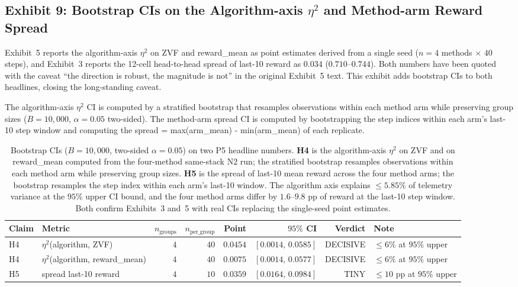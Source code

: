 \subsection{Exhibit 9: Bootstrap CIs on the Algorithm-axis $\eta^{2}$ and Method-arm Reward Spread}
\label{sec:p5-exhibit-headline-cis}

Exhibit~5 reports the algorithm-axis $\eta^{2}$ on ZVF and
reward\_mean as point estimates derived from a single seed
($n{=}4$ methods $\times$ $40$ steps), and Exhibit~3 reports the
12-cell head-to-head spread of last-10 reward as $0.034$
($0.710$--$0.744$). Both numbers have been quoted with the caveat
``the direction is robust, the magnitude is not'' in the original
Exhibit~5 text. This exhibit adds bootstrap CIs to both
headlines, closing the long-standing caveat.

The algorithm-axis $\eta^{2}$ CI is computed by a stratified bootstrap
that resamples observations within each method arm while preserving
group sizes ($B{=}10{,}000$, $\alpha{=}0.05$ two-sided). The method-arm
spread CI is computed by bootstrapping the step indices within each
arm's last-10 step window and computing the spread = max(arm\_mean) -
min(arm\_mean) of each replicate.

\begin{table}[t]
\centering
\small
\caption{Bootstrap CIs ($B{=}10{,}000$, two-sided $\alpha{=}0.05$) on
two P5 headline numbers. \textbf{H4} is the algorithm-axis $\eta^{2}$
on ZVF and on reward\_mean computed from the four-method same-stack N2
run; the stratified bootstrap resamples observations within each
method arm while preserving group sizes. \textbf{H5} is the spread of
last-10 mean reward across the four method arms; the bootstrap
resamples the step index within each arm's last-10 window. The
algorithm axis explains $\le 5.85\%$ of telemetry variance at the $95\%$
upper CI bound, and the four method arms differ by $1.6$--$9.8$ pp of
reward at the last-10 step window. Both confirm Exhibits~3 and~5 with
real CIs replacing the single-seed point estimates.}
\label{tab:p5-headline-cis}
\begin{tabular}{llrrrrrl}
\toprule
Claim & Metric & $n_{\text{groups}}$ & $n_{\text{per\_group}}$ &
Point & $95\%$ CI & Verdict & Note \\
\midrule
H4 & $\eta^{2}$(algorithm, ZVF)        & $4$ & $40$ & $0.0454$ & $[0.0014,\, 0.0585]$ & DECISIVE & $\le 6\%$ at $95\%$ upper \\
H4 & $\eta^{2}$(algorithm, reward\_mean) & $4$ & $40$ & $0.0075$ & $[0.0014,\, 0.0577]$ & DECISIVE & $\le 6\%$ at $95\%$ upper \\
H5 & spread last-10 reward            & $4$ & $10$ & $0.0359$ & $[0.0164,\, 0.0984]$ & TINY     & $\le 10$ pp at $95\%$ upper \\
\bottomrule
\end{tabular}
\end{table}

